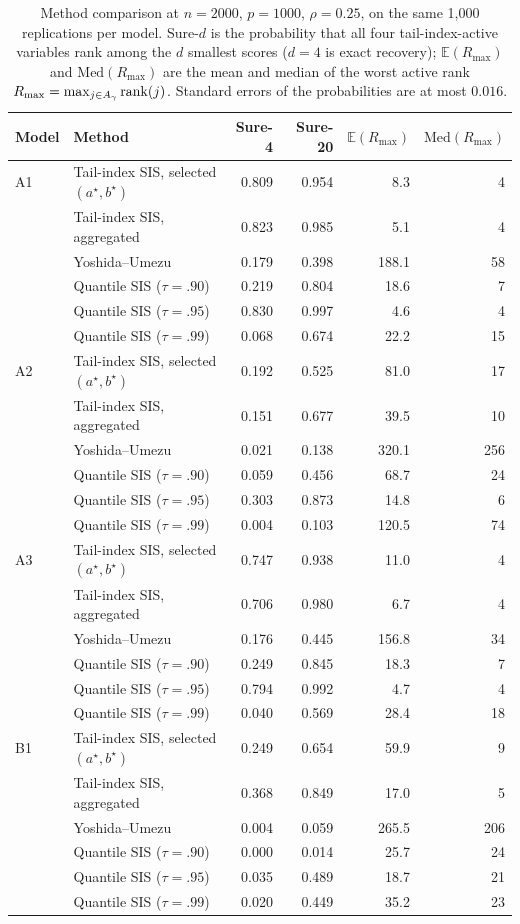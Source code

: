 \begin{table}[t]
\centering
\caption{Method comparison at $n=2000$, $p=1000$, $\rho=0.25$, on the same 1{,}000 replications per model. Sure-$d$ is the probability that all four tail-index-active variables rank among the $d$ smallest scores ($d=4$ is exact recovery); $\mathbb{E}(R_{\max})$ and $\mathrm{Med}(R_{\max})$ are the mean and median of the worst active rank $R_{\max}=\max_{j\in A_\gamma}\mathrm{rank}(j)$. Standard errors of the probabilities are at most $0.016$.}
\label{tab:cmp1000}
\begin{tabular}{llrrrr}
\toprule
Model & Method & Sure-4 & Sure-20 & $\mathbb{E}(R_{\max})$ & $\mathrm{Med}(R_{\max})$\\
\midrule
A1 & Tail-index SIS, selected $(a^\star,b^\star)$ & 0.809 & 0.954 & 8.3 & 4\\
 & Tail-index SIS, aggregated & 0.823 & 0.985 & 5.1 & 4\\
 & Yoshida--Umezu & 0.179 & 0.398 & 188.1 & 58\\
 & Quantile SIS ($\tau=.90$) & 0.219 & 0.804 & 18.6 & 7\\
 & Quantile SIS ($\tau=.95$) & 0.830 & 0.997 & 4.6 & 4\\
 & Quantile SIS ($\tau=.99$) & 0.068 & 0.674 & 22.2 & 15\\
\addlinespace
A2 & Tail-index SIS, selected $(a^\star,b^\star)$ & 0.192 & 0.525 & 81.0 & 17\\
 & Tail-index SIS, aggregated & 0.151 & 0.677 & 39.5 & 10\\
 & Yoshida--Umezu & 0.021 & 0.138 & 320.1 & 256\\
 & Quantile SIS ($\tau=.90$) & 0.059 & 0.456 & 68.7 & 24\\
 & Quantile SIS ($\tau=.95$) & 0.303 & 0.873 & 14.8 & 6\\
 & Quantile SIS ($\tau=.99$) & 0.004 & 0.103 & 120.5 & 74\\
\addlinespace
A3 & Tail-index SIS, selected $(a^\star,b^\star)$ & 0.747 & 0.938 & 11.0 & 4\\
 & Tail-index SIS, aggregated & 0.706 & 0.980 & 6.7 & 4\\
 & Yoshida--Umezu & 0.176 & 0.445 & 156.8 & 34\\
 & Quantile SIS ($\tau=.90$) & 0.249 & 0.845 & 18.3 & 7\\
 & Quantile SIS ($\tau=.95$) & 0.794 & 0.992 & 4.7 & 4\\
 & Quantile SIS ($\tau=.99$) & 0.040 & 0.569 & 28.4 & 18\\
\addlinespace
B1 & Tail-index SIS, selected $(a^\star,b^\star)$ & 0.249 & 0.654 & 59.9 & 9\\
 & Tail-index SIS, aggregated & 0.368 & 0.849 & 17.0 & 5\\
 & Yoshida--Umezu & 0.004 & 0.059 & 265.5 & 206\\
 & Quantile SIS ($\tau=.90$) & 0.000 & 0.014 & 25.7 & 24\\
 & Quantile SIS ($\tau=.95$) & 0.035 & 0.489 & 18.7 & 21\\
 & Quantile SIS ($\tau=.99$) & 0.020 & 0.449 & 35.2 & 23\\
\bottomrule
\end{tabular}
\end{table}
